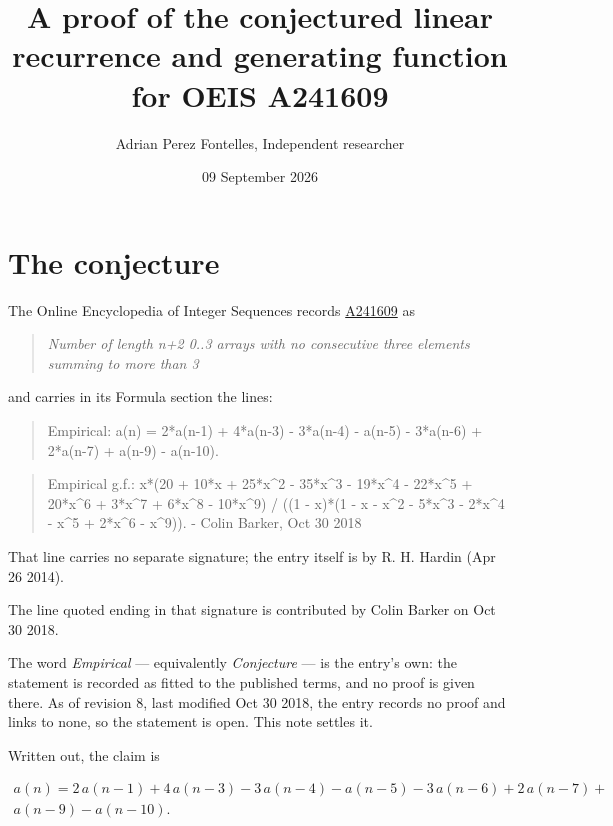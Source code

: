 \documentclass[11pt]{article}
\title{A proof of the conjectured linear recurrence and generating function for OEIS A241609}
\author{Adrian Perez Fontelles, Independent researcher}
\date{09 September 2026}
\theoremstyle{definition}
\begin{document}
\maketitle
\section{The conjecture}

The Online Encyclopedia of Integer Sequences records \href{https://oeis.org/A241609}{A241609} as

\begin{quote}\itshape Number of length n+2 0..3 arrays with no consecutive three elements summing to more than 3\end{quote}

and carries in its Formula section the lines:

\begin{quote}\ttfamily Empirical: a(n) = 2*a(n-1) + 4*a(n-3) - 3*a(n-4) - a(n-5) - 3*a(n-6) + 2*a(n-7) + a(n-9) - a(n-10).\end{quote}

\begin{quote}\ttfamily Empirical g.f.: x*(20 + 10*x + 25*x\textasciicircum{}2 - 35*x\textasciicircum{}3 - 19*x\textasciicircum{}4 - 22*x\textasciicircum{}5 + 20*x\textasciicircum{}6 + 3*x\textasciicircum{}7 + 6*x\textasciicircum{}8 - 10*x\textasciicircum{}9) / ((1 - x)*(1 - x - x\textasciicircum{}2 - 5*x\textasciicircum{}3 - 2*x\textasciicircum{}4 - x\textasciicircum{}5 + 2*x\textasciicircum{}6 - x\textasciicircum{}9)). - Colin Barker, Oct 30 2018\end{quote}

That line carries no separate signature; the entry itself is by R. H. Hardin (Apr 26 2014).

The line quoted ending in that signature is contributed by Colin Barker on Oct 30 2018.

The word {\itshape Empirical} --- equivalently {\itshape Conjecture} --- is the entry's own: the statement is recorded as fitted to the published terms, and no proof is given there. As of revision 8, last modified Oct 30 2018, the entry records no proof and links to none, so the statement is open. This note settles it.

Written out, the claim is

\begin{multline*} a(n) = 2\,a(n-1) + 4\,a(n-3) - 3\,a(n-4) - a(n-5) - 3\,a(n-6) + 2\,a(n-7) + \\ a(n-9) - a(n-10). \end{multline*}
\end{document}
